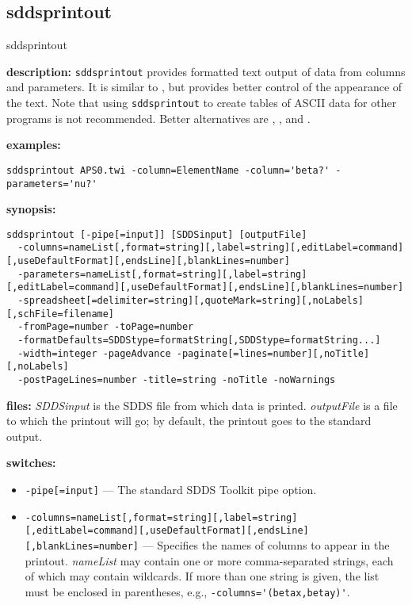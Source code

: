 \newpage
\subsection{sddsprintout}
\label{sddsprintout}

\begin{sddsprog}{sddsprintout}
  \item \textbf{description:} \verb|sddsprintout| provides formatted text output of data from columns and parameters. It is similar to , but provides better control of the appearance of the text. Note that using \verb|sddsprintout| to create tables of ASCII data for other programs is not recommended. Better alternatives are , , and .
  \item \textbf{examples:}
    \begin{verbatim}
sddsprintout APS0.twi -column=ElementName -column='beta?' -parameters='nu?'
    \end{verbatim}
  \item \textbf{synopsis:}
    \begin{verbatim}
sddsprintout [-pipe[=input]] [SDDSinput] [outputFile]
  -columns=nameList[,format=string][,label=string][,editLabel=command][,useDefaultFormat][,endsLine][,blankLines=number]
  -parameters=nameList[,format=string][,label=string][,editLabel=command][,useDefaultFormat][,endsLine][,blankLines=number]
  -spreadsheet[=delimiter=string][,quoteMark=string][,noLabels][,schFile=filename]
  -fromPage=number -toPage=number
  -formatDefaults=SDDStype=formatString[,SDDStype=formatString...]
  -width=integer -pageAdvance -paginate[=lines=number][,noTitle][,noLabels]
  -postPageLines=number -title=string -noTitle -noWarnings
    \end{verbatim}
  \item \textbf{files:} \emph{SDDSinput} is the SDDS file from which data is printed. \emph{outputFile} is a file to which the printout will go; by default, the printout goes to the standard output.
  \item \textbf{switches:}
    \begin{itemize}
      \item \verb|-pipe[=input]| --- The standard SDDS Toolkit pipe option.
      \item \verb|-columns=nameList[,format=string][,label=string][,editLabel=command][,useDefaultFormat][,endsLine][,blankLines=number]| --- Specifies the names of columns to appear in the printout. \emph{nameList} may contain one or more comma-separated strings, each of which may contain wildcards. If more than one string is given, the list must be enclosed in parentheses, e.g., \verb|-columns='(betax,betay)'|.

\end{itemize}
\end{sddsprog}
